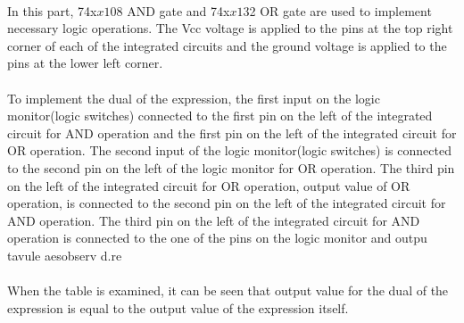 \documentclass[pdftex,12pt,a4paper]{article}
\begin{document}
\begin{flushleft}




\paragraph{}
In this part, 74x$x{1}$08 AND gate and 74x$x{1}$32 OR gate are used to implement necessary logic operations. The Vcc voltage is applied to the pins at the top right corner of each of the integrated circuits and the ground voltage is applied to the pins at the lower left corner. 

\paragraph{}
To implement the dual of the expression, the first input on the logic monitor(logic switches) connected to the first pin on the left of the integrated circuit for AND operation and the first pin on the left of the integrated circuit for OR operation. The second input of the logic monitor(logic switches) is connected to the second pin on the left of the logic monitor for OR operation. The third pin on the left of the integrated circuit for OR operation, output value of OR operation, is connected to the second pin on the left of the integrated circuit for AND operation. The third pin on the left of the integrated circuit for AND operation is connected to the one of the pins on the logic monitor and outpu
 tavule
 aesobserv d.re%

\paragraph{}
When the table is examined, it can be seen that output value for the dual of the expression is equal to the output value of the expression itself.
\end{flushleft}
\end{document}
